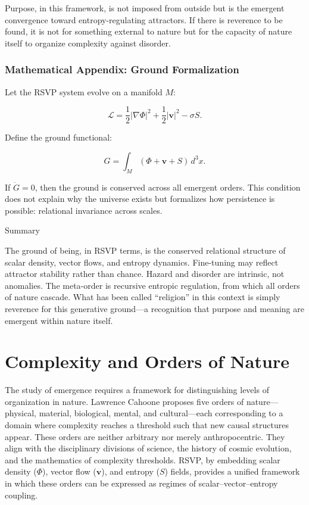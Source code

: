 \documentclass[12pt]{book}
\begin{document}
Purpose, in this framework, is not imposed from outside but is the emergent convergence toward entropy-regulating attractors. If there is reverence to be found, it is not for something external to nature but for the capacity of nature itself to organize complexity against disorder.

\subsection{Mathematical Appendix: Ground Formalization}
Let the RSVP system evolve on a manifold \( M \):

\[ \mathcal{L} = \frac{1}{2}|\nabla \Phi|^2 + \frac{1}{2}|\mathbf{v}|^2 - \sigma S. \]

Define the ground functional:

\[ G = \int_M \left( \Phi + \mathbf{v} + S \right) \, d^3x. \]

If \( \dot{G} = 0 \), then the ground is conserved across all emergent orders. This condition does not explain why the universe exists but formalizes how persistence is possible: relational invariance across scales.

Summary

The ground of being, in RSVP terms, is the conserved relational structure of scalar density, vector flows, and entropy dynamics. Fine-tuning may reflect attractor stability rather than chance. Hazard and disorder are intrinsic, not anomalies. The meta-order is recursive entropic regulation, from which all orders of nature cascade. What has been called “religion” in this context is simply reverence for this generative ground—a recognition that purpose and meaning are emergent within nature itself.

\chapter{Complexity and Orders of Nature}
The study of emergence requires a framework for distinguishing levels of organization in nature. Lawrence Cahoone proposes five orders of nature—physical, material, biological, mental, and cultural—each corresponding to a domain where complexity reaches a threshold such that new causal structures appear. These orders are neither arbitrary nor merely anthropocentric. They align with the disciplinary divisions of science, the history of cosmic evolution, and the mathematics of complexity thresholds. RSVP, by embedding scalar density (\( \Phi \)), vector flow (\( \mathbf{v} \)), and entropy (\( S \)) fields, provides a unified framework in which these orders can be expressed as regimes of scalar–vector–entropy coupling.
\end{document}
